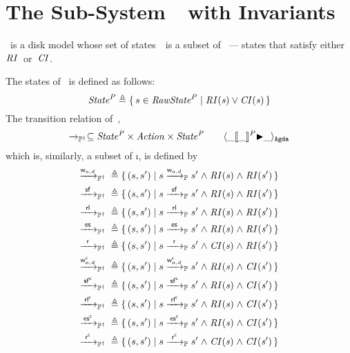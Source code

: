 
\section{The Sub-System~\ProgInv\ with Invariants}
\label{sec:ProgInv}
\ProgInv\ is a disk model whose set of states~\AgdaId{\ProgInvState}\ is a subset of \ProgState\ --- states that satisfy either $\mathit{RI}$~or~$\mathit{CI}$.

The states of \ProgInv\ is defined as follows:
$$\mathit{State}^P {}\triangleq{}{} \{\, s \in \mathit{RawState}^P \mid \mathit{RI(s) \lor CI(s)} \,\}$$
The transition relation of~\ProgInv,
$$\xrightarrow{}_{\mathbb P^\dagger} \subseteq \mathit{State^P} \times \mathit{Action} \times \mathit{State^P} \qquad \langle \_[\kern-1.5pt[\_]\kern-1.5pt]^P{\blacktriangleright}\_ \rangle_\mathtt{Agda} $$
which is, similarly, a subset of \i{\ttP{}}, is defined by
\begin{alignat*}{3}
	\ttPI{\awa{w}{\actw_{a, d}}} \defeq{}& \{\, (s, s') \mid s \ttP{\awa{w}{\actw_{a, d}}} s' \conj \i{RI(s)} \conj \i{RI(s')} \,\} \\
	\ttPI{\awa{w}\actf} \defeq{}& \{\, (s, s') \mid s \ttP{\awa{w}\actf} s' \conj \i{RI(s)} \conj \i{RI(s')} \,\} \\
    \ttPI{\awa{w}\actcp} \defeq{}& \{\, (s, s') \mid s \ttP{\awa{w}\actcp} s' \conj \i{RI(s)} \conj \i{RI(s')} \,\} \\
    \ttPI{\awa{w}\actes} \defeq{}& \{\, (s, s') \mid s \ttP{\awa{w}\actes} s' \conj \i{RI(s)} \conj \i{RI(s')} \,\} \\
	\ttPI{\awa{w}\actr} \defeq{}& \{\, (s, s') \mid s \ttP{\awa{w}\actr} s' \conj \i{CI(s)} \conj \i{RI(s')} \,\} \\
	\ttPI{\awa{w}{\actwc_{a, d}}} \defeq{}& \{\, (s, s') \mid s \ttP{\awa{w}{\actwc_{a, d}}} s' \conj \i{RI(s)} \conj \i{CI(s')} \,\} \\
	\ttPI{\awa{w}\actfc} \defeq{}& \{\, (s, s') \mid s \ttP{\awa{w}\actfc} s' \conj \i{RI(s)} \conj \i{CI(s')} \,\} \\
	\ttPI{\awa{w}\actcpc} \defeq{}& \{\, (s, s') \mid s \ttP{\awa{w}\actcpc} s' \conj \i{RI(s)} \conj \i{CI(s')} \,\} \\
	\ttPI{\awa{w}\actesc} \defeq{}& \{\, (s, s') \mid s \ttP{\awa{w}\actesc} s' \conj \i{RI(s)} \conj \i{CI(s')} \,\} \\
	\ttPI{\awa{w}\actrc} \defeq{}& \{\, (s, s') \mid s \ttP{\awa{w}\actrc} s' \conj \i{CI(s)} \conj \i{CI(s')} \,\} 
\end{alignat*}

